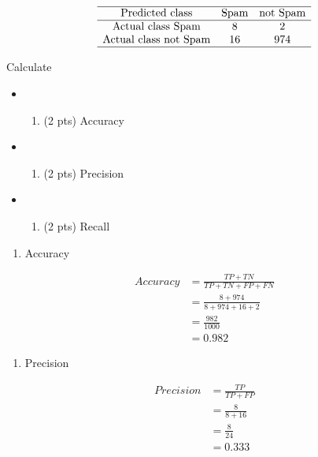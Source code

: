 \documentclass[11pt]{article}
\providecommand{\tightlist}{%
      \setlength{\itemsep}{0pt}\setlength{\parskip}{0pt}}
\begin{document}
\[
\begin{array}{cccc}
\hline
\text{Predicted class} & \text{Spam} & \text{not Spam} \\
\hline
\text{Actual class Spam} & 8 & 2 \\
\text{Actual class not Spam} & 16 & 974 \\
\hline
\end{array}
\]

    Calculate

\begin{itemize}
\item
  \begin{enumerate}
  \def\labelenumi{(\alph{enumi})}
  \tightlist
  \item
    (2 pts) Accuracy
  \end{enumerate}
\item
  \begin{enumerate}
  \def\labelenumi{(\alph{enumi})}
  \setcounter{enumi}{1}
  \tightlist
  \item
    (2 pts) Precision
  \end{enumerate}
\item
  \begin{enumerate}
  \def\labelenumi{(\alph{enumi})}
  \setcounter{enumi}{2}
  \tightlist
  \item
    (2 pts) Recall
  \end{enumerate}
\end{itemize}

    \begin{enumerate}
\def\labelenumi{(\alph{enumi})}
\tightlist
\item
  Accuracy
\end{enumerate}

\[
\begin{align}
Accuracy &= \frac{TP + TN}{TP + TN + FP + FN} \\
&= \frac{8 + 974}{8 + 974 + 16 + 2} \\
&= \frac{982}{1000} \\
&= 0.982
\end{align}
\]

    \begin{enumerate}
\def\labelenumi{(\alph{enumi})}
\setcounter{enumi}{1}
\tightlist
\item
  Precision
\end{enumerate}

\[
\begin{align}
Precision &= \frac{TP}{TP + FP} \\
&= \frac{8}{8 + 16} \\
&= \frac{8}{24} \\
&= 0.333
\end{align}
\]
\end{document}

